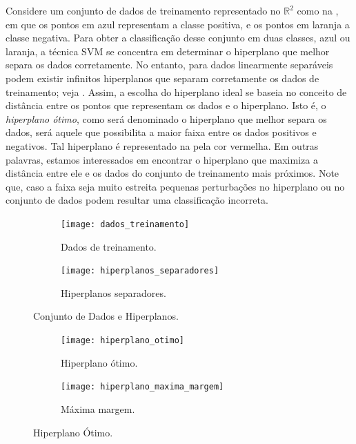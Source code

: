 \documentclass[12pt,a4paper]{scrartcl}
\def\RR{\mathds{R}}
\theoremstyle{definition}%
\begin{document}
Considere um conjunto de dados de treinamento representado no $\RR^2$ como na , em que os pontos em azul representam a classe positiva, e os pontos em laranja a classe negativa. Para obter a classificação desse conjunto em duas classes, azul ou laranja, a técnica SVM se concentra em determinar o hiperplano que melhor separa os dados corretamente. No entanto, para dados linearmente separáveis podem existir infinitos hiperplanos que separam corretamente os dados de treinamento; veja . Assim, a escolha do hiperplano ideal se baseia no conceito de distância entre os pontos que representam os dados e o hiperplano. Isto é, o \emph{hiperplano ótimo}, como será denominado o hiperplano que melhor separa os dados, será aquele que possibilita a maior faixa entre os dados positivos e negativos. Tal hiperplano é representado na  pela cor vermelha. Em outras palavras, estamos interessados em encontrar o hiperplano que maximiza a distância entre ele e os dados do conjunto de treinamento mais próximos. Note que, caso a faixa seja muito estreita pequenas perturbações no hiperplano ou no conjunto de dados podem resultar uma classificação incorreta. 

\begin{figure}[htbp] 
	\centering
	\begin{subfigure}[h]{0.38\textwidth}
		\centering
		\texttt{[image: dados\_treinamento]}
		\caption{Dados de treinamento. \label{fig:dados_e_hiperplanos:dados_treinamento}}
	\end{subfigure}
	\begin{subfigure}[h]{0.38\textwidth}
		\centering
		\texttt{[image: hiperplanos\_separadores]}
		\caption{Hiperplanos separadores. \label{fig:dados_e_hiperplanos:hiperplanos_separadores}}
	\end{subfigure}
\caption{Conjunto de Dados e Hiperplanos. \label{fig:dados_e_hiperplanos}}
\end{figure}
\begin{figure}[hbtp] 
	\centering
	\begin{subfigure}[h]{0.38\textwidth}
		\centering
		\texttt{[image: hiperplano\_otimo]}
		\caption{Hiperplano ótimo. \label{fig:dados_e_hiperplano_otimo:hiperplano_otimo}}
	\end{subfigure}
	\begin{subfigure}[h]{0.40\textwidth}
		\centering
		\texttt{[image: hiperplano\_maxima\_margem]}
		\caption{Máxima margem. \label{fig:dados_e_hiperplano_otimo:hiperplano_maxima_margem}}	
	\end{subfigure}
\caption{Hiperplano Ótimo. \label{fig:dados_e_hiperplano_otimo}}
\end{figure}
\end{document}
